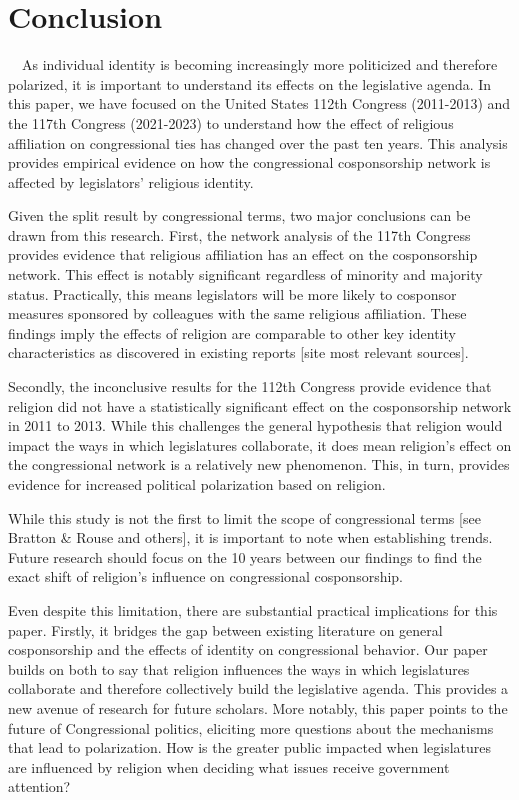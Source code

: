 \documentclass[Royal,times,sageh]{sagej}
\begin{document}
\hypertarget{conclusion}{%
\section{Conclusion}\label{conclusion}}

~~As individual identity is becoming increasingly more politicized and therefore polarized, it is important to understand its effects on the legislative agenda. In this paper, we have focused on the United States 112th Congress (2011-2013) and the 117th Congress (2021-2023) to understand how the effect of religious affiliation on congressional ties has changed over the past ten years. This analysis provides empirical evidence on how the congressional cosponsorship network is affected by legislators' religious identity.

Given the split result by congressional terms, two major conclusions can be drawn from this research. First, the network analysis of the 117th Congress provides evidence that religious affiliation has an effect on the cosponsorship network. This effect is notably significant regardless of minority and majority status. Practically, this means legislators will be more likely to cosponsor measures sponsored by colleagues with the same religious affiliation. These findings imply the effects of religion are comparable to other key identity characteristics as discovered in existing reports {[}site most relevant sources{]}.

Secondly, the inconclusive results for the 112th Congress provide evidence that religion did not have a statistically significant effect on the cosponsorship network in 2011 to 2013. While this challenges the general hypothesis that religion would impact the ways in which legislatures collaborate, it does mean religion's effect on the congressional network is a relatively new phenomenon. This, in turn, provides evidence for increased political polarization based on religion.

While this study is not the first to limit the scope of congressional terms {[}see Bratton \& Rouse and others{]}, it is important to note when establishing trends. Future research should focus on the 10 years between our findings to find the exact shift of religion's influence on congressional cosponsorship.

Even despite this limitation, there are substantial practical implications for this paper. Firstly, it bridges the gap between existing literature on general cosponsorship and the effects of identity on congressional behavior. Our paper builds on both to say that religion influences the ways in which legislatures collaborate and therefore collectively build the legislative agenda. This provides a new avenue of research for future scholars. More notably, this paper points to the future of Congressional politics, eliciting more questions about the mechanisms that lead to polarization. How is the greater public impacted when legislatures are influenced by religion when deciding what issues receive government attention?
\end{document}
